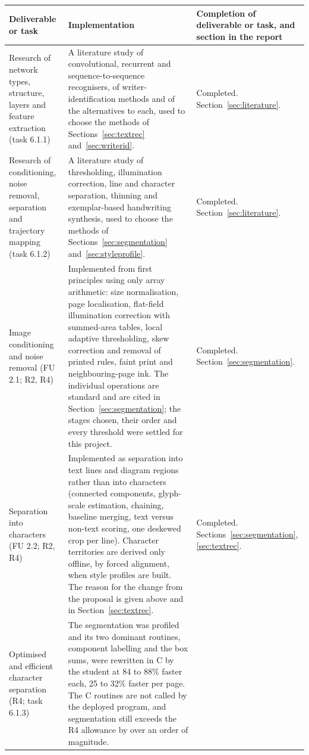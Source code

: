 \begin{table}[!htbp]
\centering
\fontsize{8}{9.4}\selectfont
\setlength{\tabcolsep}{3pt}
\renewcommand{\arraystretch}{1.0}
\begin{tabular}{|p{3.1cm}|p{7.4cm}|p{3.7cm}|}
\hline
\textbf{Deliverable or task} & \textbf{Implementation} & \textbf{Completion of deliverable or task, and section in the report} \\
\hline
Research of network types, structure, layers and feature extraction (task 6.1.1) &
A literature study of convolutional, recurrent and sequence-to-sequence recognisers, of writer-identification methods and of the alternatives to each, used to choose the methods of Sections~\ref{sec:textrec} and~\ref{sec:writerid}. &
Completed. Section~\ref{sec:literature}. \\
\hline
Research of conditioning, noise removal, separation and trajectory mapping (task 6.1.2) &
A literature study of thresholding, illumination correction, line and character separation, thinning and exemplar-based handwriting synthesis, used to choose the methods of Sections~\ref{sec:segmentation} and~\ref{sec:styleprofile}. &
Completed. Section~\ref{sec:literature}. \\
\hline
Image conditioning and noise removal (FU 2.1; R2, R4) &
Implemented from first principles using only array arithmetic: size normalisation, page localisation, flat-field illumination correction with summed-area tables, local adaptive thresholding, skew correction and removal of printed rules, faint print and neighbouring-page ink. The individual operations are standard and are cited in Section~\ref{sec:segmentation}; the stages chosen, their order and every threshold were settled for this project. &
Completed. Section~\ref{sec:segmentation}. \\
\hline
Separation into characters (FU 2.2; R2, R4) &
Implemented as separation into text lines and diagram regions rather than into characters (connected components, glyph-scale estimation, chaining, baseline merging, text versus non-text scoring, one deskewed crop per line). Character territories are derived only offline, by forced alignment, when style profiles are built. The reason for the change from the proposal is given above and in Section~\ref{sec:textrec}. &
Completed. Sections~\ref{sec:segmentation}, \ref{sec:textrec}. \\
\hline
Optimised and efficient character separation (R4; task 6.1.3) &
The segmentation was profiled and its two dominant routines, component labelling and the box sums, were rewritten in C by the student at 84 to 88\% faster each, 25 to 32\% faster per page. The C routines are not called by the deployed program, and segmentation still exceeds the R4 allowance by over an order of magnitude. &

\end{tabular}
\end{table}
